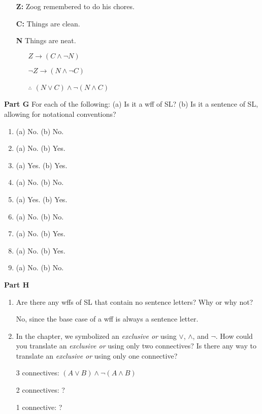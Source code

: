 \documentclass[12pt, letterpaper, twoside]{article}
\begin{document}
\begin{enumerate}
	\item[\textbf{Z:}] Zoog remembered to do his chores.
	\item[\textbf{C:}] Things are clean.
	\item[\textbf{N}] Things are neat.
	
    \begin{enumerate}
        \item[] $Z \rightarrow (C \wedge \neg N)$
        \item[] $\neg Z \rightarrow (N \wedge \neg C)$
        \item[$\therefore$] $(N \vee C) \wedge \neg (N
          \wedge C)$
    \end{enumerate}
\end{enumerate}

\noindent \textbf{Part G} For each of the following: (a) Is
it a wff of SL? (b) Is it a sentence of SL, allowing for
notational conventions?
\begin{enumerate}
	\item (a) No. (b) No.
	\item (a) No. (b) Yes.
	\item (a) Yes. (b) Yes.
	\item (a) No. (b) No.
	\item (a) Yes. (b) Yes.
	\item (a) No. (b) No.
	\item (a) No. (b) Yes.
	\item (a) No. (b) Yes.
	\item (a) No. (b) No.
\end{enumerate}

\noindent \textbf{Part H}
\begin{enumerate}
	\item Are there any wffs of SL that contain no
          sentence letters? Why or why not?

	No, since the base case of a wff is always a
        sentence letter.

	\item In the chapter, we symbolized an
          \emph{exclusive or} using $\vee$, $\wedge$, and
          $\neg$. How could you translate an \emph{exclusive
            or} using only two connectives? Is there any way
          to translate an \emph{exclusive or} using only one
          connective?

	3 connectives: $(A \vee B) \wedge \neg (A \wedge B)$

	2 connectives: ?

	1 connective: ?
\end{enumerate}
\end{document}
